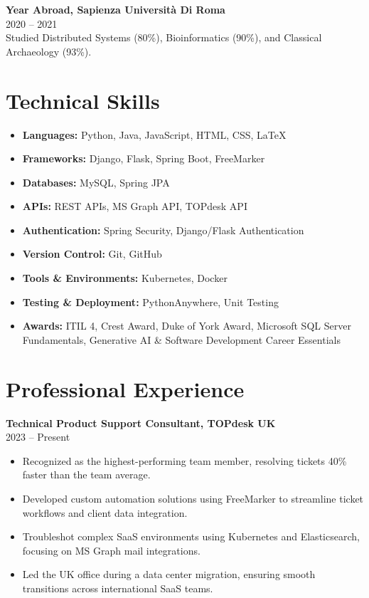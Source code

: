 \documentclass[a4paper,10pt]{article}
\begin{document}
\textbf{Year Abroad, Sapienza Università Di Roma} \\
2020 -- 2021 \\
Studied Distributed Systems (80\%), Bioinformatics (90\%), and Classical Archaeology (93\%).

\vspace{0.3cm}

\section*{Technical Skills}
\begin{itemize}[left=0.15cm]
    \item \textbf{Languages:} Python, Java, JavaScript, HTML, CSS, LaTeX
    \item \textbf{Frameworks:} Django, Flask, Spring Boot, FreeMarker
    \item \textbf{Databases:} MySQL, Spring JPA
    \item \textbf{APIs:} REST APIs, MS Graph API, TOPdesk API
    \item \textbf{Authentication:} Spring Security, Django/Flask Authentication
    \item \textbf{Version Control:} Git, GitHub
    \item \textbf{Tools \& Environments:} Kubernetes, Docker
    \item \textbf{Testing \& Deployment:} PythonAnywhere, Unit Testing
    \item \textbf{Awards:} ITIL 4, Crest Award, Duke of York Award, Microsoft SQL Server Fundamentals, Generative AI \& Software Development Career Essentials
\end{itemize}

\vspace{0.3cm}

\section*{Professional Experience}
\textbf{Technical Product Support Consultant, TOPdesk UK} \\
2023 -- Present \\
\begin{itemize}[left=0.15cm]
    \item Recognized as the highest-performing team member, resolving tickets 40\% faster than the team average.
    \item Developed custom automation solutions using FreeMarker to streamline ticket workflows and client data integration.
    \item Troubleshot complex SaaS environments using Kubernetes and Elasticsearch, focusing on MS Graph mail integrations.
    \item Led the UK office during a data center migration, ensuring smooth transitions across international SaaS teams.
\end{itemize}
\end{document}

